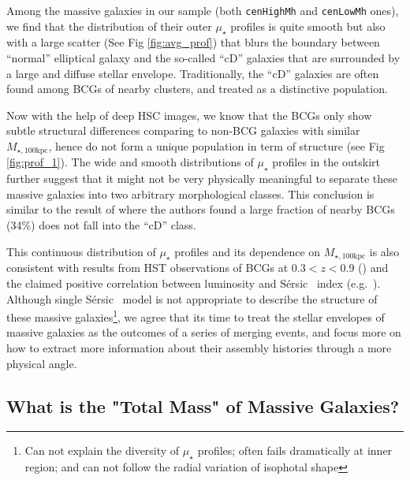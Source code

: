 \documentclass[a4paper,fleqn,usenatbib]{mnras}
\def\ser{{S\'{e}rsic\ }}
\def\rbcg{\texttt{cenHighMh}}
\def\nbcg{\texttt{cenLowMh}}
\def\mtot{{$M_{\star,100\mathrm{kpc}}$}}
\def\mden{{$\mu_{\star}$}}
\begin{document}
    Among the massive galaxies in our sample (both \rbcg{} and \nbcg{} ones), we find that 
    the distribution of their outer \mden{} profiles is quite smooth but also with a large
    scatter (See Fig \ref{fig:avg_prof}) that blurs the boundary between ``normal'' 
    elliptical galaxy and the so-called ``cD'' galaxies that are surrounded by a large 
    and diffuse stellar envelope. 
    Traditionally, the ``cD'' galaxies are often found among BCGs of nearby clusters, 
    and treated as a distinctive population.  
    
    Now with the help of deep HSC images, we know that the BCGs only show subtle 
    structural differences comparing to non-BCG galaxies with similar \mtot{}, hence do 
    not form a unique population in term of structure (see Fig \ref{fig:prof_1}). 
    The wide and smooth distributions of \mden{} profiles in the outskirt further suggest 
    that it might not be very physically meaningful to separate these massive galaxies 
    into two arbitrary morphological classes. 
    This conclusion is similar to the result of \citep{Zhao2015} where the authors found 
    a large fraction of nearby BCGs (34\%) does not fall into the ``cD'' class.
    
    This continuous distribution of \mden{} profiles and its dependence on \mtot{} is 
    also consistent with results from HST observations of BCGs at $0.3 < z <0.9$ 
    (\citealt{Bai2014}) and the claimed positive correlation between luminosity and \ser 
    index (e.g.\ \citealt{Savorgnan13}). 
    Although single \ser{} model is not appropriate to describe the structure of these 
    massive galaxies\footnote{Can not explain the diversity of \mden{} profiles; often 
    fails dramatically at inner region; and can not follow the radial variation of 
    isophotal shape}, we agree that its time to treat the stellar envelopes of massive 
    galaxies as the outcomes of a series of merging events, and focus more on how to 
    extract more information about their assembly histories through a more physical 
    angle.    
    
 
\subsection{What is the "Total Mass" of Massive Galaxies?}
            
\end{document}
